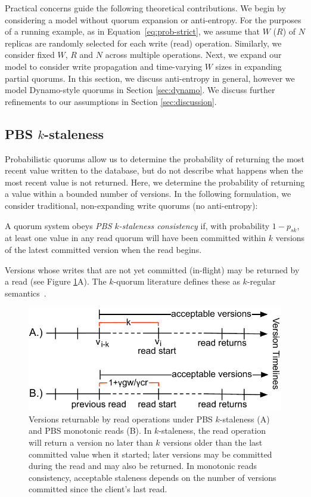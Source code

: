 \documentclass{vldb}
\newcommand{\subsectionskip}{-0em}
\begin{document}
Practical concerns guide the following theoretical contributions.  We
begin by considering a model without quorum expansion or anti-entropy.
For the purposes of a running example, as in
Equation~\ref{eq:prob-strict}, we assume that $W$ ($R$) of $N$
replicas are randomly selected for each write (read) operation.
Similarly, we consider fixed $W$, $R$ and $N$ across multiple
operations. Next, we expand our model to consider write propagation
and time-varying $W$ sizes in expanding partial quorums.  In this
section, we discuss anti-entropy in general, however we model
Dynamo-style quorums in Section \ref{sec:dynamo}. We discuss further
refinements to our assumptions in Section \ref{sec:discussion}.

\vspace{\subsectionskip}\subsection{PBS $k$-staleness}
\label{sec:kstale}

Probabilistic quorums allow us to determine the probability of
returning the most recent value written to the database, but do not
describe what happens when the most recent value is not returned.
Here, we determine the probability of returning a value within a
bounded number of versions.  In the following formulation, we consider
traditional, non-expanding write quorums (no anti-entropy):
\begin{definition}
A quorum system obeys \textit{PBS $k$-staleness consistency} if, with
probability $1-p_{sk}$, at least one value in any read quorum will
have been committed within $k$ versions of the latest committed
version when the read begins.
\end{definition}
Versions whose writes that are not yet committed (in-flight) may be
returned by a read (see Figure \ref{fig:timelines}A).  The $k$-quorum
literature defines these as $k$-regular semantics~\cite{non-strict}.

\begin{figure}
\centering
\includegraphics[width=.95\columnwidth]{figs/timelines.pdf}
\vspace{-8pt}
\caption{Versions returnable by read operations under PBS
  $k$-staleness (A) and PBS monotonic reads (B). In $k$-staleness, the
  read operation will return a version no later than $k$ versions
  older than the last committed value when it started; later versions
  may be committed during the read and may also be returned.  In
  monotonic reads consistency, acceptable staleness depends on the
  number of versions committed since the client's last read.}
\vspace{-12pt}
\label{fig:timelines}
\end{figure}
\end{document}
